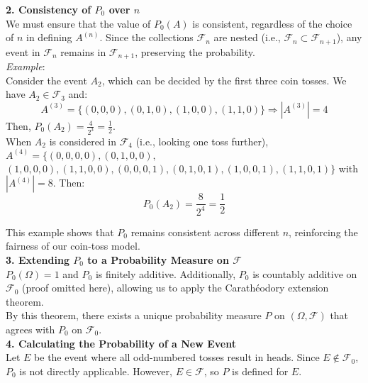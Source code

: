\textbf{2. Consistency of \( P_0 \) over \( n \)}\\

We must ensure that the value of \( P_0(A) \) is consistent, regardless of the choice of \( n \) in defining \( A^{(n)} \). Since the collections \( \mathcal{F}_n \) are nested (i.e., \( \mathcal{F}_n \subset \mathcal{F}_{n+1} \)), any event in \( \mathcal{F}_n \) remains in \( \mathcal{F}_{n+1} \), preserving the probability.\\
   
\textit{Example}: \\

Consider the event \( A_2 \), which can be decided by the first three coin tosses. We have \( A_2 \in \mathcal{F}_3 \) and:
     \[
     A^{(3)} = \{(0,0,0), (0,1,0), (1,0,0), (1,1,0)\} \Rightarrow |A^{(3)}| = 4
     \]
     Then, \( P_0(A_2) = \frac{4}{2^3} = \frac{1}{2} \).\\
   
When \( A_2 \) is considered in \( \mathcal{F}_4 \) (i.e., looking one toss further), \( A^{(4)} = \{(0,0,0,0), (0,1,0,0),  \) 
\((1,0,0,0), (1,1,0,0), (0,0,0,1), (0,1,0,1), (1,0,0,1), (1,1,0,1)\} \) with \( |A^{(4)}| = 8 \). Then:
     \[
     P_0(A_2) = \frac{8}{2^4} = \frac{1}{2}
     \]

This example shows that \( P_0 \) remains consistent across different \( n \), reinforcing the fairness of our coin-toss model.\\

\textbf{3. Extending \( P_0 \) to a Probability Measure on \( \mathcal{F} \)}\\


\( P_0(\Omega) = 1 \) and \( P_0 \) is finitely additive. Additionally, \( P_0 \) is countably additive on \( \mathcal{F}_0 \) (proof omitted here), allowing us to apply the Carathéodory extension theorem.\\

By this theorem, there exists a unique probability measure \( P \) on \( (\Omega, \mathcal{F}) \) that agrees with \( P_0 \) on \( \mathcal{F}_0 \).\\


\textbf{4. Calculating the Probability of a New Event}\\

Let \( E \) be the event where all odd-numbered tosses result in heads. Since \( E \notin \mathcal{F}_0 \), \( P_0 \) is not directly applicable. However, \( E \in \mathcal{F} \), so \( P \) is defined for \( E \).\\

